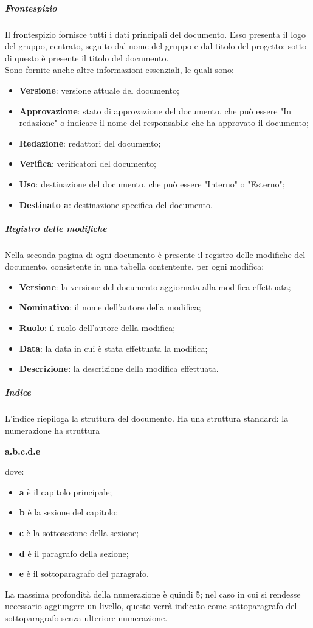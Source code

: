 \documentclass[../norme-di-progetto.tex]{subfiles}
\begin{document}
\subparagraph*{Frontespizio}
Il frontespizio fornisce tutti i dati principali del documento. Esso presenta il logo del gruppo, centrato, seguito dal nome del gruppo e dal titolo del progetto; sotto di questo è presente il titolo del documento. \\
Sono fornite anche altre informazioni essenziali, le quali sono:
\begin{itemize}
  \item \textbf{Versione}: versione attuale del documento;
  \item \textbf{Approvazione}: stato di approvazione del documento, che può essere "In redazione" o indicare il nome del responsabile che ha approvato il documento;
  \item \textbf{Redazione}: redattori del documento;
  \item \textbf{Verifica}: verificatori del documento;
  \item \textbf{Uso}: destinazione del documento, che può essere "Interno" o "Esterno";
  \item \textbf{Destinato a}: destinazione specifica del documento.
\end{itemize}
\subparagraph*{Registro delle modifiche}
Nella seconda pagina di ogni documento è presente il registro delle modifiche del documento, consistente in una tabella contentente, per ogni modifica:
\begin{itemize}
  \item \textbf{Versione}: la versione del documento aggiornata alla modifica effettuata;
  \item \textbf{Nominativo}: il nome dell'autore della modifica;
  \item \textbf{Ruolo}: il ruolo dell'autore della modifica;
  \item \textbf{Data}: la data in cui è stata effettuata la modifica;
  \item \textbf{Descrizione}: la descrizione della modifica effettuata.
\end{itemize}
\subparagraph*{Indice}
L'indice riepiloga la struttura del documento. Ha una struttura standard: la numerazione ha struttura \begin{center}
  \centering
  \textbf{a.b.c.d.e}
\end{center} dove:
\begin{itemize}
  \item \textbf{a} è il capitolo principale;
  \item \textbf{b} è la sezione del capitolo;
  \item \textbf{c} è la sottosezione della sezione;
  \item \textbf{d} è il paragrafo della sezione;
  \item \textbf{e} è il sottoparagrafo del paragrafo.
\end{itemize}
La massima profondità della numerazione è quindi 5; nel caso in cui si rendesse necessario aggiungere un livello, questo verrà indicato come sottoparagrafo del sottoparagrafo senza ulteriore numerazione.
\end{document}
